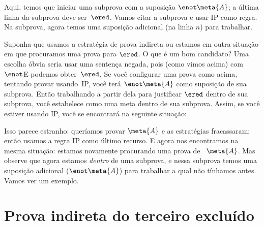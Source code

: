 \begin{fitchproof}
\open
{}
\ellipsesline 
{}
\close
{}
\end{fitchproof}
Aqui, temos que iniciar uma subprova com a suposição $\enot \meta{A}$;
a última linha da subprova deve ser~$\ered$. Vamos citar a subprova e usar  IP como regra. Na subprova, agora temos uma suposição adicional (na linha $n$) para trabalhar.

Suponha que usamos a estratégia de prova indireta ou estamos em outra situação em que procuramos uma prova para  $\ered$. O que é um bom candidato? Uma escolha óbvia seria usar uma sentença negada, pois (como vimos acima) com $\enot$E podemos obter~$\ered$. 
 Se você configurar uma prova como acima, tentando provar  usando~IP, você terá $\enot \meta{A}$ como suposição de sua subprova. Então trabalhando a partir dela para justificar $\ered$ dentro de sua subprova, você estabelece  como uma meta dentro de sua subprova. Assim, se você estiver usando  IP, você se encontrará na seguinte situação:
\begin{fitchproof}
\open
{}
\ellipsesline
{}
\close
{}
\end{fitchproof} 


Isso parece estranho: queríamos provar $\meta{A}$ e as estratégias fracassaram; então usamos a regra  IP como último recurso. E agora nos encontramos na mesma situação: estamos novamente procurando uma prova de ~$\meta{A}$. Mas observe que agora estamos \emph{dentro} de uma subprova, e nessa subprova temos uma suposição adicional ($\enot \meta{A}$) para trabalhar a qual não tínhamos antes. Vamos ver um exemplo.


\section{Prova indireta do terceiro excluído}\label{s:proofLEM}


